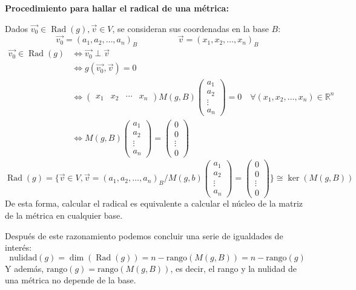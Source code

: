 \documentclass[x11names,table]{report}
\DeclareMathOperator{\rad}{Rad}
\begin{document}
\textbf{Procedimiento para hallar el radical de una métrica:}

Dados $\vec{v_0}\in \rad(g),\vec{v}\in V$, se consideran sus coordenadas en la base $B$:
\[\vec{v_0}=(a_1,a_2,\dots,a_n)_B\hspace{2cm}\vec{v}=(x_1,x_2,\dots,x_n)_B\]
\begin{align*}
\vec{v_0}\in\rad (g) & \Leftrightarrow \vec{v_0}\perp\vec{v}\\
&\Leftrightarrow g(\vec{v_0},\vec{v})=0\\
&\Leftrightarrow\begin{pmatrix}
x_1 & x_2 & \cdots & x_n
\end{pmatrix} M(g,B) \begin{pmatrix}
a_1 \\ a_2 \\ \vdots \\ a_n
\end{pmatrix}=0\quad\forall (x_1,x_2,\dots,x_n)\in\mathbb{R}^n\\
&\Leftrightarrow M(g,B) \begin{pmatrix}
a_1 \\ a_2 \\ \vdots \\ a_n
\end{pmatrix}=\begin{pmatrix}
0 \\ 0 \\ \vdots \\ 0
\end{pmatrix}
\end{align*}
$\rad(g)=\lbrace \vec{v}\in V, \vec{v}=(a_1,a_2,\dots,a_n)_B / M(g,b)\begin{pmatrix}
a_1\\ a_2 \\ \vdots \\ a_n
\end{pmatrix}=\begin{pmatrix}
0 \\ 0 \\ \vdots \\ 0
\end{pmatrix}\rbrace\cong\ker(M(g,B))$
De esta forma, calcular el radical es equivalente a calcular el núcleo de la matriz de la métrica en cualquier base.

Después de este razonamiento podemos concluir una serie de igualdades de interés:
\[\text{nulidad}(g)=\dim(\rad(g))=n-\text{rango}(M(g,B))=n-\text{rango}(g)\]
Y además, $\text{rango}(g)=\text{rango}(M(g,B))$, es decir, el rango y la nulidad de una métrica no depende de la base.
\end{document}
